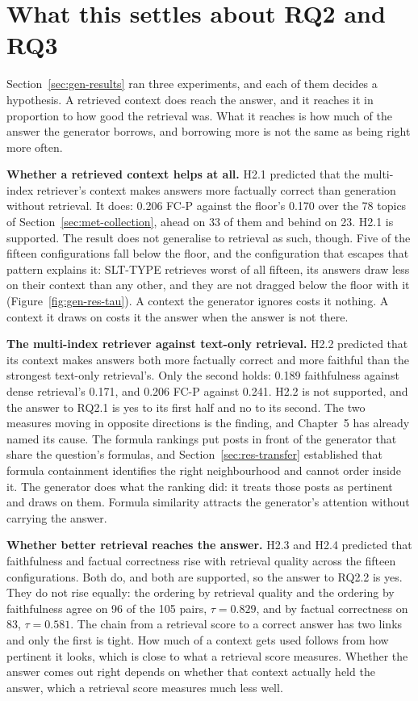 \section{What this settles about RQ2 and RQ3}\label{sec:gen-verdicts}

Section~\ref{sec:gen-results} ran three experiments, and each of them decides a hypothesis. A
retrieved context does reach the answer, and it reaches it in proportion to how good the retrieval
was. What it reaches is how much of the answer the generator borrows, and borrowing more is not the
same as being right more often.

\textbf{Whether a retrieved context helps at all.} H2.1 predicted that the multi-index retriever's
context makes answers more factually correct than generation without retrieval. It does: 0.206 FC-P
against the floor's 0.170 over the 78 topics of Section~\ref{sec:met-collection}, ahead on 33 of
them and behind on 23. H2.1 is supported. The result does not generalise to retrieval as such,
though. Five of the fifteen configurations fall below the floor, and the configuration that escapes
that pattern explains it: SLT-TYPE retrieves worst of all fifteen, its answers draw less on their
context than any other, and they are not dragged below the floor with it
(Figure~\ref{fig:gen-res-tau}). A context the generator ignores costs it nothing. A context it draws
on costs it the answer when the answer is not there.

\textbf{The multi-index retriever against text-only retrieval.} H2.2 predicted that its context
makes answers both more factually correct and more faithful than the strongest text-only
retrieval's. Only the second holds: 0.189 faithfulness against dense retrieval's 0.171, and 0.206
FC-P against 0.241. H2.2 is not supported, and the answer to RQ2.1 is yes to its first half and no
to its second. The two measures moving in opposite directions is the finding, and Chapter~5 has
already named its cause. The formula rankings put posts in front of the generator that share the
question's formulas, and Section~\ref{sec:res-transfer} established that formula containment
identifies the right neighbourhood and cannot order inside it. The generator does what the ranking
did: it treats those posts as pertinent and draws on them. Formula similarity attracts the
generator's attention without carrying the answer.

\textbf{Whether better retrieval reaches the answer.} H2.3 and H2.4 predicted that faithfulness and
factual correctness rise with retrieval quality across the fifteen configurations. Both do, and
both are supported, so the answer to RQ2.2 is yes. They do not rise equally: the ordering by
retrieval quality and the ordering by faithfulness agree on 96 of the 105 pairs, $\tau = 0.829$,
and by factual correctness on 83, $\tau = 0.581$. The chain from a retrieval score to a correct
answer has two links and only the first is tight. How much of a context gets used follows from how
pertinent it looks, which is close to what a retrieval score measures. Whether the answer comes out
right depends on whether that context actually held the answer, which a retrieval score measures
much less well.

